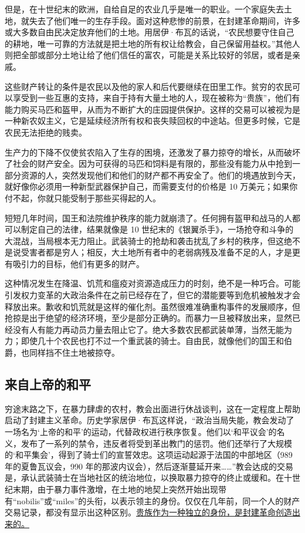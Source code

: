但是，在十世纪末的欧洲，自给自足的农业几乎是唯一的职业。一个家庭失去土地，就失去了他们唯一的生存手段。面对这种悲惨的前景，在封建革命期间，许多或大多数自由民决定放弃他们的土地。用居伊·布瓦的话说，“农民想要守住自己的耕地，唯一可靠的方法就是把土地的所有权让给教会，自己保留用益权。”其他人则把全部或部分土地让给了他们信任的富农，可能是关系比较好的邻居，或者是亲戚。


这些财产转让的条件是农民以及他的家人和后代要继续在田里工作。贫穷的农民可以享受到一些互惠的支持，来自于持有大量土地的人，现在被称为“贵族”，他们有能力购买马匹和盔甲，从而为不断扩大的庄园提供保护。这样的交易可以被视为是一种新农奴主义，它是延续经济所有权和丧失赎回权的中途站。但更多时候，它是农民无法拒绝的贱卖。

生产力的下降不仅使贫农陷入了生存的困境，还激发了暴力掠夺的增长，从而破坏了社会的财产安全。因为可获得的马匹和饲料是有限的，那些没有能力从中抢到一部分资源的人，突然发现他们和他们的财产都不再安全了。他们的境遇放到今天，就好像你必须用一种新型武器保护自己，而需要支付的价格是 10 万美元；如果你付不起，你就只能受制于那些买得起的人。

短短几年时间，国王和法院维护秩序的能力就崩溃了。任何拥有盔甲和战马的人都可以制定自己的法律，结果就像是 10 世纪末的《银翼杀手》，一场抢夺和斗争的大混战，当局根本无力阻止。武装骑士的抢劫和袭击扰乱了乡村的秩序，但这绝不是说受害者都是穷人；相反，大土地所有者中的老弱病残及准备不足的人，才是更有吸引力的目标，他们有更多的财产。

这种情况发生在降温、饥荒和瘟疫对资源造成压力的时刻，绝不是一种巧合。可能引发权力变革的大政治条件在之前已经存在了，但它的潜能要等到危机被触发才会释放出来。歉收和饥荒就是这样的催化剂。虽然很难准确重构事件的发展顺序，但抢掠是出于绝望的经济环境，至少是部分正确的。而暴力一旦被释放出来，显然已经没有人有能力再动员力量去阻止它了。绝大多数农民都武装单薄，当然无能为力；即使几十个农民也打不过一个重武装的骑士。自由民，就像他们的国王和伯爵，也同样挡不住土地被掠夺。

\subsection{来自上帝的和平}
穷途末路之下，在暴力肆虐的农村，教会出面进行休战谈判，这在一定程度上帮助启动了封建主义革命。历史学家居伊·布瓦这样说，“政治当局失能，教会发动了一场名为‘上帝的和平’的运动，代替政权进行秩序恢复。他们以‘和平议会’的名义，发布了一系列的禁令，违反者将受到革出教门的惩罚。他们还举行了大规模的‘和平集会’，得到了骑士们的宣誓效忠。这项运动起源于法国的中部地区（989 年的夏鲁瓦议会，990 年的那波内议会），然后逐渐蔓延开来……”教会达成的交易是，承认武装骑士在当地社区的统治地位，以换取暴力掠夺的终止或缓和。在十世纪末期，由于暴力事件激增，在土地的地契上突然开始出现带有“nobilis”或“miles”的头衔，以表示领主的身份。仅仅在几年前，同一个人的财产交易记录，都没有显示出这种区别。\uline{贵族作为一种独立的身份，是封建革命创造出来的。}

